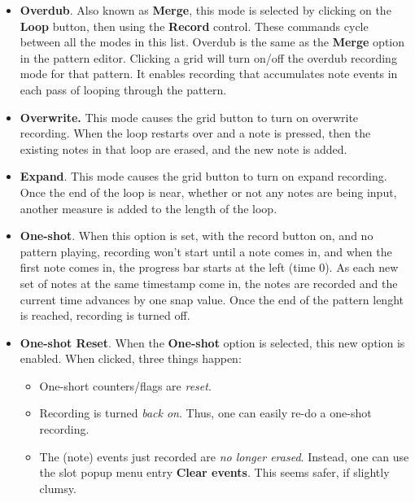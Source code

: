    \begin{itemize}
      \item \textbf{Overdub}.
         Also known as \textbf{Merge},
         this mode is selected by clicking on the \textbf{Loop} button,
         then using the \textbf{Record} control.
         These commands cycle between all the modes in this list.
         Overdub is the same as the \textbf{Merge} option in the 
         pattern editor.
         Clicking a grid will turn on/off the overdub recording mode
         for that pattern.
         It enables recording that accumulates note events in each pass of
         looping through the pattern.
      \item \textbf{Overwrite.}
         This mode causes the grid button to turn on overwrite recording.
         When the loop restarts over and a note is pressed,
         then the existing notes in that loop are erased,
         and the new note is added.
      \item \textbf{Expand}.
         This mode causes the grid button to turn on expand recording.
         Once the end of the loop is near, whether or
         not any notes are being input, another measure is added to the length
         of the loop.
      \item \textbf{One-shot}.
         When this option is set, with the record button on, and no pattern
         playing, recording won't start until a note comes in, and when the
         first note comes in, the progress bar starts at the left (time 0).
         As each new set of notes at the same timestamp come in, the
         notes are recorded and the current time advances by one snap value.
         Once the end of the pattern lenght is reached, recording is turned
         off.
      \item \textbf{One-shot Reset}.
         When the \textbf{One-shot} option is selected, this new option
         is enabled.
         When clicked, three things happen:
         \begin{itemize}
            \item One-short counters/flags are \textsl{reset}.
            \item Recording is turned \textsl{back on}.
               Thus, one can easily re-do a one-shot recording.
            \item The (note) events just recorded are \textsl{no longer
            erased}. Instead, one can use the slot popup menu entry
            \textbf{Clear events}.
            This seems safer, if slightly clumsy.
         \end{itemize}
   \end{itemize}

